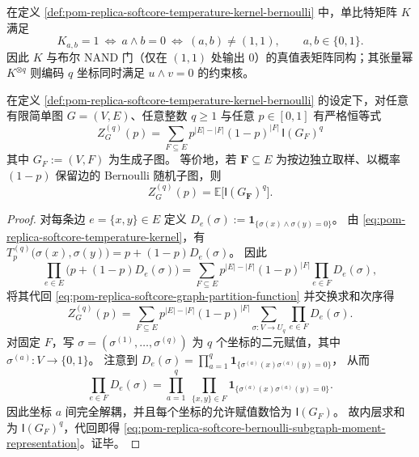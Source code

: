 \begin{remark}\label{rem:pom-replica-softcore-temperature-kernel-nand}
在定义 \ref{def:pom-replica-softcore-temperature-kernel-bernoulli} 中，单比特矩阵 \(K\) 满足
\[
K_{a,b}=1\ \Longleftrightarrow\ a\wedge b=0
\ \Longleftrightarrow\ (a,b)\neq(1,1),
\qquad a,b\in\{0,1\}.
\]
因此 \(K\) 与布尔 NAND 门（仅在 \((1,1)\) 处输出 \(0\)）的真值表矩阵同构；其张量幂 \(K^{\otimes q}\) 则编码 \(q\) 坐标同时满足 \(u\wedge v=0\) 的约束核。
\end{remark}



\begin{theorem}\label{thm:pom-replica-softcore-bernoulli-subgraph-moment-representation}
在定义 \ref{def:pom-replica-softcore-temperature-kernel-bernoulli} 的设定下，对任意有限简单图 \(G=(V,E)\)、任意整数 \(q\ge 1\) 与任意 \(p\in[0,1]\) 有严格恒等式
\begin{equation}\label{eq:pom-replica-softcore-bernoulli-subgraph-moment-representation}
\boxed{\;
Z_G^{(q)}(p)
=\sum_{F\subseteq E}p^{|E|-|F|}(1-p)^{|F|}\,\mathsf{I}(G_F)^{q}\;}
\end{equation}
其中 \(G_F:=(V,F)\) 为生成子图。
等价地，若 \(\mathbf{F}\subseteq E\) 为按边独立取样、以概率 \((1-p)\) 保留边的 Bernoulli 随机子图，则
\[
Z_G^{(q)}(p)=\mathbb{E}\bigl[\mathsf{I}(G_{\mathbf{F}})^{q}\bigr].
\]
\end{theorem}
\begin{proof}
对每条边 \(e=\{x,y\}\in E\) 定义
\(
D_e(\sigma):=\mathbf{1}_{\{\sigma(x)\wedge\sigma(y)=0\}}
\)。
由 \eqref{eq:pom-replica-softcore-temperature-kernel}，有
\(
T^{(q)}_p\bigl(\sigma(x),\sigma(y)\bigr)=p+(1-p)D_e(\sigma)
\)。
因此
\[
\prod_{e\in E}\bigl(p+(1-p)D_e(\sigma)\bigr)
=\sum_{F\subseteq E}p^{|E|-|F|}(1-p)^{|F|}\prod_{e\in F}D_e(\sigma),
\]
将其代回 \eqref{eq:pom-replica-softcore-graph-partition-function} 并交换求和次序得
\[
Z_G^{(q)}(p)
=\sum_{F\subseteq E}p^{|E|-|F|}(1-p)^{|F|}
\sum_{\sigma:V\to U_q}\prod_{e\in F}D_e(\sigma).
\]
对固定 \(F\)，写 \(\sigma=(\sigma^{(1)},\dots,\sigma^{(q)})\) 为 \(q\) 个坐标的二元赋值，其中 \(\sigma^{(a)}:V\to\{0,1\}\)。
注意到
\(
D_e(\sigma)=\prod_{a=1}^q\mathbf{1}_{\{\sigma^{(a)}(x)\sigma^{(a)}(y)=0\}}
\)，
从而
\[
\prod_{e\in F}D_e(\sigma)
=\prod_{a=1}^{q}\ \prod_{\{x,y\}\in F}\mathbf{1}_{\{\sigma^{(a)}(x)\sigma^{(a)}(y)=0\}}.
\]
因此坐标 \(a\) 间完全解耦，并且每个坐标的允许赋值数恰为 \(\mathsf{I}(G_F)\)。
故内层求和为 \(\mathsf{I}(G_F)^q\)，代回即得 \eqref{eq:pom-replica-softcore-bernoulli-subgraph-moment-representation}。证毕。
\end{proof}

